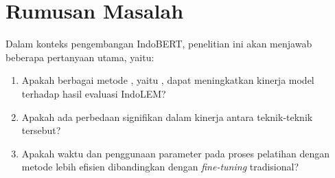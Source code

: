 \section{Rumusan Masalah}

Dalam konteks pengembangan IndoBERT, penelitian ini akan menjawab beberapa pertanyaan utama, yaitu:

\begin{enumerate}
    \item Apakah berbagai metode \PEFT, yaitu \methodPEFT, dapat meningkatkan kinerja model terhadap hasil evaluasi IndoLEM?
    \item Apakah ada perbedaan signifikan dalam kinerja antara teknik-teknik \PEFT tersebut?
    \item Apakah waktu dan penggunaan parameter pada proses pelatihan dengan metode \PEFT lebih efisien dibandingkan dengan \textit{fine-tuning} tradisional?
\end{enumerate}

